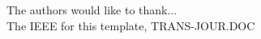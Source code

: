 \documentclass[10pt,journal,compsoc]{IEEEtran}
\begin{document}
The authors would like to thank...\\
The IEEE for this template, TRANS-JOUR.DOC


\ifCLASSOPTIONcaptionsoff
  \newpage
\fi





%
%
%
\end{document}

